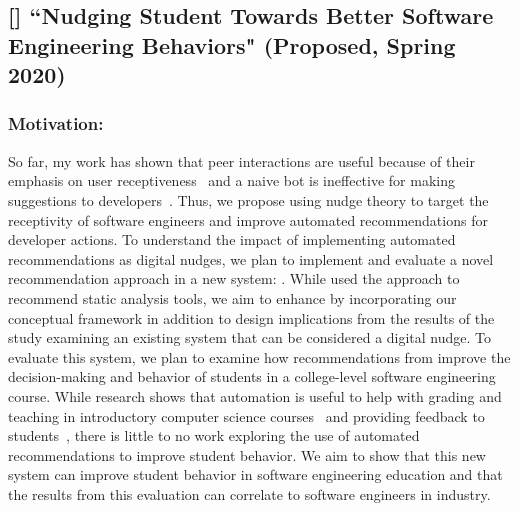 \subsection{[\nudgeT] ``Nudging Student Towards Better Software Engineering Behaviors" (Proposed, Spring 2020)}

\subsubsection{Motivation:}

So far, my work has shown that peer interactions are useful because of their emphasis on user receptiveness~\cite{VLHCC} and a naive bot is ineffective for making suggestions to developers~\cite{BotSE}. Thus, we propose using nudge theory to target the receptivity of software engineers and improve automated recommendations for developer actions. To understand the impact of implementing automated recommendations as digital nudges, we plan to implement and evaluate a novel recommendation approach in a new system: \TOOL. While \tool used the \naive approach to recommend static analysis tools, we aim to enhance \TOOL by incorporating our conceptual framework in addition to design implications from the results of the \sugg study examining an existing system that can be considered a digital nudge. To evaluate this system, we plan to examine how recommendations from \TOOL improve the decision-making and behavior of students in a college-level software engineering course. While research shows that automation is useful to help with grading and teaching in introductory computer science courses~\cite{singh2013automated} and providing feedback to students~\cite{hu2019feedback}, there is little to no work exploring the use of automated recommendations to improve student behavior. We aim to show that this new system can improve student behavior in software engineering education and that the results from this evaluation can correlate to software engineers in industry.

